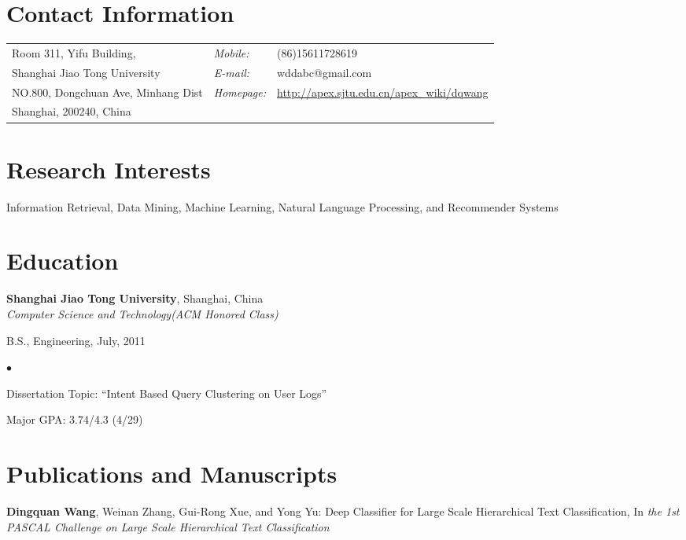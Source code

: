 \documentclass[margin,line]{res}
\newenvironment{list1}{
  \begin{list}{\ding{113}}{%
      \setlength{\itemsep}{0in}
      \setlength{\parsep}{0in} \setlength{\parskip}{0in}
      \setlength{\topsep}{0in} \setlength{\partopsep}{0in} 
      \setlength{\leftmargin}{0.17in}}}{\end{list}}
\newenvironment{list2}{
  \begin{list}{$\bullet$}{%
      \setlength{\itemsep}{0in}
      \setlength{\parsep}{0in} \setlength{\parskip}{0in}
      \setlength{\topsep}{0in} \setlength{\partopsep}{0in} 
      \setlength{\leftmargin}{0.2in}}}{\end{list}}
\begin{document}

\begin{resume}
\section{\sc Contact Information}
\vspace{.05in}
\begin{tabular}{@{}p{2.5in}p{0.55in}p{2in}}
Room 311, Yifu Building, & {\it Mobile:}& (86)15611728619 \\  
Shanghai Jiao Tong University& {\it E-mail:}& wddabc@gmail.com\\
NO.800, Dongchuan Ave, Minhang Dist & {\it Homepage:}& \href{http://apex.sjtu.edu.cn/apex\_wiki/dqwang}{http://apex.sjtu.edu.cn/apex\_wiki/dqwang}\\ 
Shanghai, 200240, China & \\  
\end{tabular}


\section{\sc Research Interests}
Information Retrieval, Data Mining, Machine Learning, Natural Language Processing, and Recommender Systems 
\section{\sc Education}
{\bf Shanghai Jiao Tong University}, Shanghai, China\\
{\em Computer Science and Technology(ACM Honored Class)} 
\vspace*{-.0in}
\begin{list1}
\item[] B.S., Engineering, July, 2011 
\begin{list2}
\vspace*{.05in}
\item Dissertation Topic:  ``Intent Based Query Clustering on User Logs'' 
\item Major GPA: 3.74/4.3 (4/29)
\end{list2}
\end{list1}
\section{\sc Publications and Manuscripts}
\textbf{Dingquan Wang}, Weinan Zhang, Gui-Rong Xue, and Yong Yu:
Deep Classifier for Large Scale Hierarchical Text Classification,
In\emph{ the 1st PASCAL Challenge on Large Scale Hierarchical Text Classification}


\end{resume}
\end{document}
